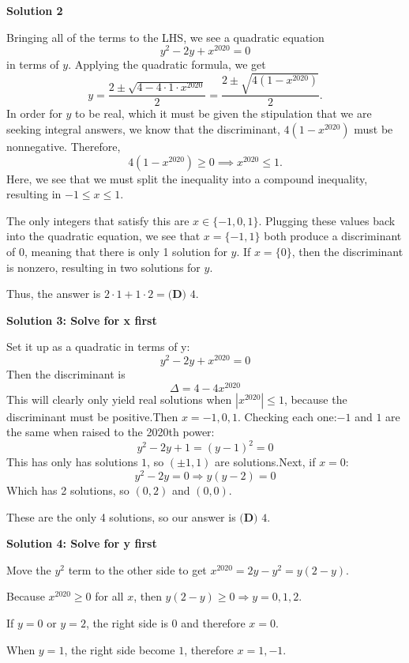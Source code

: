\begin{enumerate}
 



\textbf{Solution 2}

Bringing all of the terms to the LHS, we see a quadratic equation 
 \[y^2 - 2y + x^{2020} = 0\] in terms of $y$. Applying the quadratic formula, we get 
 \[y = \frac{2\pm\sqrt{4-4\cdot1\cdot x^{2020}}}{2}=\frac{2\pm\sqrt{4(1-x^{2020})}}{2}.\] In order for $y$ to be real, which it must be given the stipulation that we are seeking integral answers, we know that the discriminant, $4(1-x^{2020})$ must be nonnegative. Therefore, 
 \[4(1-x^{2020}) \geq 0 \implies x^{2020} \leq 1.\] Here, we see that we must split the inequality into a compound inequality, resulting in $-1 \leq x \leq 1$. 

 The only integers that satisfy this are $x \in \{-1,0,1\}$. Plugging these values back into the quadratic equation, we see that $x = \{-1,1\}$ both produce a discriminant of $0$, meaning that there is only 1 solution for $y$. If $x = \{0\}$, then the discriminant is nonzero, resulting in two solutions for $y$. 

 Thus, the answer is $2 \cdot 1 + 1 \cdot 2 = \boxed{\textbf{(D) }4}$.

 



\textbf{Solution 3: Solve for x first}

Set it up as a quadratic in terms of y:
 \[y^2-2y+x^{2020}=0\]Then the discriminant is
 \[\Delta = 4-4x^{2020}\]This will clearly only yield real solutions when $|x^{2020}| \leq 1$, because the discriminant must be positive.Then $x=-1,0,1$. Checking each one:$-1$ and $1$ are the same when raised to the 2020th power:
 \[y^2-2y+1=(y-1)^2=0\]This has only has solutions $1$, so $(\pm 1,1)$ are solutions.Next, if $x=0$:
 \[y^2-2y=0 \Rightarrow y(y-2)=0\]Which has 2 solutions, so $(0,2)$ and $(0,0)$.

 These are the only 4 solutions, so our answer is $\boxed{\textbf{(D) } 4}$.

 



\textbf{Solution 4: Solve for y first}

Move the $y^2$ term to the other side to get $x^{2020}=2y-y^2 = y(2-y)$. 

 Because $x^{2020} \geq 0$ for all $x$, then $y(2-y) \geq 0 \Rightarrow y = 0,1,2$. 

 If $y=0$ or $y=2$, the right side is $0$ and therefore $x=0$. 

 When $y=1$, the right side become $1$, therefore $x=1,-1$. 


\end{enumerate}

